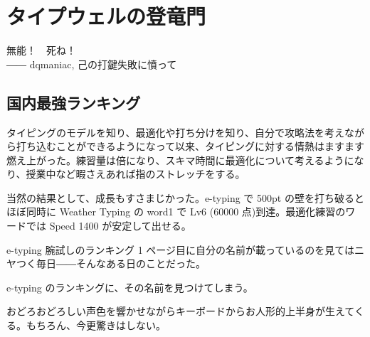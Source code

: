 \section{タイプウェルの登竜門}
\begin{screen}
無能！　死ね！\\
―― dqmaniac, 己の打鍵失敗に憤って
\end{screen}

\subsection{国内最強ランキング}

タイピングのモデルを知り、最適化や打ち分けを知り、自分で攻略法を考えながら打ち込むことができるようになって以来、タイピングに対する情熱はますます燃え上がった。練習量は倍になり、スキマ時間に最適化について考えるようになり、授業中など暇さえあれば指のストレッチをする。

当然の結果として、成長もすさまじかった。e-typing で 500pt の壁を打ち破るとほぼ同時に Weather Typing の word1 で Lv6 (60000 点)到達。最適化練習のワードでは Speed 1400 が安定して出せる。

e-typing 腕試しのランキング 1 ページ目に自分の名前が載っているのを見てはニヤつく毎日――そんなある日のことだった。


e-typing のランキングに、その名前を見つけてしまう。


おどろおどろしい声色を響かせながらキーボードからお人形的上半身が生えてくる。もちろん、今更驚きはしない。







